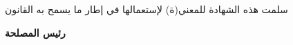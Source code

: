 \documentclass[a4paper,12pt]{article}
\begin{document}
\vspace{0.5cm}

\begin{center}
    \fontsize{14}{16}\selectfont  سلمت هذه الشهادة للمعني(ة) لإستعمالها في إطار ما يسمح به القانون 
\end{center}

\vspace{1cm}

\begin{flushleft}
    \fontsize{16}{18}\selectfont \textbf{رئيس المصلحة}
\end{flushleft}
\end{document}
